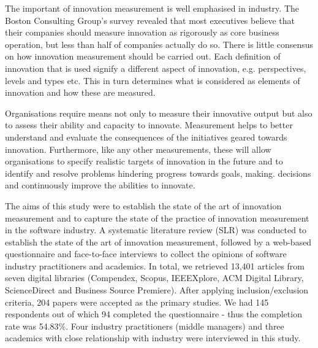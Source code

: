 \documentclass[sigplan]{acmart}
\begin{document}
The important of innovation measurement is well emphasised in industry. The Boston Consulting Group's survey \cite{andrew08} revealed that most executives believe that their companies should measure innovation as rigorously as core business operation, but less than half of companies actually do so. There is little consensus on how innovation measurement should be carried out. Each definition of innovation that is used signify a different aspect of innovation, e.g. perspectives, levels and types etc. This in turn determines what is considered as elements of innovation and how these are measured.

Organisations require means not only to measure their innovative output but also to assess their ability and capacity to innovate. Measurement helps to better understand and evaluate the consequences of the initiatives geared towards innovation. Furthermore,  like any other measurements, these will allow organisations to specify realistic targets of innovation in the future and to identify and resolve problems hindering progress towards goals, making. decisions and continuously improve the abilities to innovate.

The aims of this study were to establish the state of the art of innovation measurement and to capture the state of the practice of innovation measurement in the software industry. A systematic literature review (SLR) \cite{kitchenham07}  was conducted to establish the state of the art of innovation measurement, followed by a web-based questionnaire \cite{kasunic05} and face-to-face interviews \cite{creswell09} to collect the opinions of software industry practitioners and academics. In total, we retrieved 13,401 articles from seven digital libraries (Compendex, Scopus, IEEEXplore, ACM Digital Library, ScienceDirect and Business Source Premiere). After applying inclusion/exclusion criteria, 204 papers were accepted as the primary studies. We had 145 respondents out of which 94 completed the questionnaire - thus the completion rate was 54.83\%. Four industry practitioners (middle managers) and three academics with close relationship with industry were interviewed in this study. 
\end{document}
